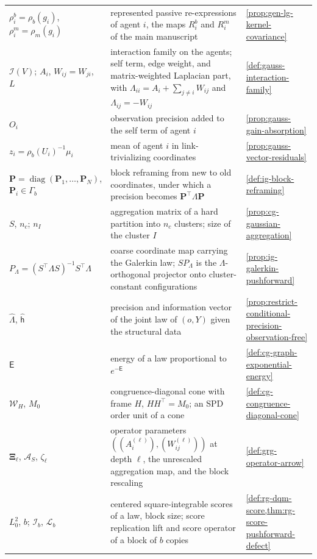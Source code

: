 {\begin{longtable}{@{}>{\raggedright\arraybackslash}p{}
>{\raggedright\arraybackslash}p{}
>{\raggedright\arraybackslash}p{}@{}}
$\rho^b_i=\rho_b(g_i)$, $\rho^m_i=\rho_m(g_i)$ & represented passive re-expressions of agent $i$, the maps $R_i^b$ and $R_i^m$ of the main manuscript & \cref{prop:gen-lg-kernel-covariance} \\
$\mathcal I(V)$; $A_i$, $W_{ij}=W_{ji}$, $L$ & interaction family on the agents; self term, edge weight, and matrix-weighted Laplacian part, with $\Lambda_{ii}=A_i+\sum_{j\neq i}W_{ij}$ and $\Lambda_{ij}=-W_{ij}$ & \cref{def:gauss-interaction-family} \\
$O_i$ & observation precision added to the self term of agent $i$ & \cref{prop:gauss-gain-absorption} \\
$z_i=\rho_b(U_i)^{-1}\mu_i$ & mean of agent $i$ in link-trivializing coordinates & \cref{prop:gauss-vector-residuals} \\
$\mathbf P=\operatorname{diag}(\mathbf P_1,\ldots,\mathbf P_N)$, $\mathbf P_i\in\Gamma_b$ & block reframing from new to old coordinates, under which a precision becomes $\mathbf P^\top\Lambda\mathbf P$ & \cref{def:ig-block-reframing} \\
$S$, $n_c$; $n_I$ & aggregation matrix of a hard partition into $n_c$ clusters; size of the cluster $I$ & \cref{prop:cg-gaussian-aggregation} \\
$P_\Lambda=(S^\top\Lambda S)^{-1}S^\top\Lambda$ & coarse coordinate map carrying the Galerkin law; $SP_\Lambda$ is the $\Lambda$-orthogonal projector onto cluster-constant configurations & \cref{prop:ig-galerkin-pushforward} \\
$\widehat\Lambda$, $\widehat{\mathsf h}$ & precision and information vector of the joint law of $(o,Y)$ given the structural data & \cref{prop:restrict-conditional-precision-observation-free} \\
$\mathsf E$ & energy of a law proportional to $e^{-\mathsf E}$ & \cref{def:cg-graph-exponential-energy} \\
$\mathcal W_H$, $M_0$ & congruence-diagonal cone with frame $H$, $HH^\top=M_0$; an SPD order unit of a cone & \cref{def:cg-congruence-diagonal-cone} \\
$\boldsymbol\Xi_\ell$, $\mathcal A_S$, $\zeta_\ell$ & operator parameters $((A_i^{(\ell)}),(W_{ij}^{(\ell)}))$ at depth $\ell$, the unrescaled aggregation map, and the block rescaling & \cref{def:grg-operator-arrow} \\
$L^2_0$, $b$; $\mathscr I_b$, $\mathscr L_b$ & centered square-integrable scores of a law, block size; score replication lift and score operator of a block of $b$ copies & \cref{def:rg-dqm-score,thm:rg-score-pushforward-defect} \\

\end{longtable}}
